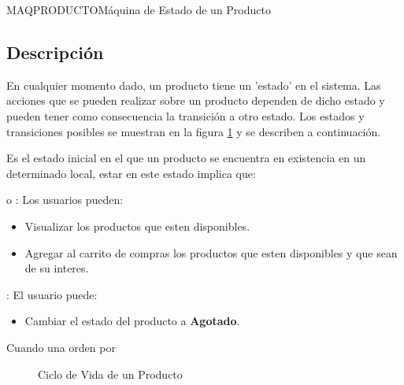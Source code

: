 \begin{Maquina}{MAQPRODUCTO}{Máquina de Estado de un Producto}
	\subsection{Descripción}
	En cualquier momento dado, un producto tiene un 'estado' en el sistema. Las acciones que se pueden realizar sobre un producto dependen de dicho estado y pueden tener como consecuencia la transición a otro estado. Los estados y transiciones posibles se muestran en la figura 	\ref{fig:maqproducto} y se describen a continuación.
				\begin{description}

			\item[Disponible] Es el estado inicial en el que un producto se encuentra en existencia en un determinado local, estar en este estado implica que:
		\item {} o : Los  usuarios pueden:
		\begin{itemize}
			\item Visualizar los productos que esten disponibles.
			\item Agregar al carrito de compras los productos que esten disponibles y que sean de su interes.
						
		\end{itemize}
		
		\item {} : El usuario puede:
		\begin{itemize}
			\item Cambiar el estado del producto a \textbf{Agotado}.
						
		\end{itemize}
		
			\item[Agotado] Cuando una orden por 
		\end{description}
	\begin{figure}[hbtp!]
	\begin{center}
		\caption{Ciclo de Vida de un Producto}
		\label{fig:maqproducto}
		\end{center}
	\end{figure}

\end{Maquina}
